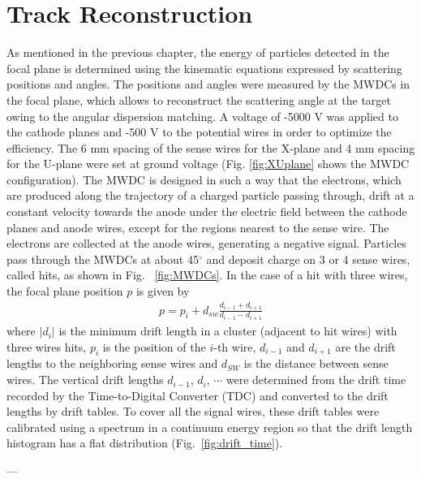 \section{Track Reconstruction}
As mentioned in the previous chapter, the energy of particles detected in the focal plane is determined using the kinematic equations expressed by scattering positions and angles.
The positions and angles were measured by the MWDCs in  the focal plane, which allows to reconstruct the scattering angle at the target owing to the angular dispersion matching. A voltage of -5000 V was applied to the cathode planes and -500 V to the potential wires in order to optimize the efficiency. The 6 mm spacing of the sense wires for the X-plane and 4 mm spacing for the U-plane were set at ground voltage (Fig. \ref{fig:XUplane} shows the MWDC configuration). The MWDC is designed in such a way that  the electrons, which are produced along the trajectory of a charged particle passing through, drift at a constant velocity  towards the anode under the electric field  between the cathode planes and anode wires, except for the regions nearest to the sense wire. The electrons are collected at the anode wires, generating a negative signal. Particles pass through the MWDCs at about 45$^{\circ}$ and deposit charge on 3 or 4 sense wires, called hits, as shown in Fig. ~\ref{fig:MWDCs}. In the case of a hit with three wires, the focal plane position $p$ is given by
\begin{equation}
    \label{eq:position}
    \begin{aligned}
    p=p_i+d_{sw}\frac{d_{i-1}+d_{i+1}}{d_{i-1}-d_{i+1}}
    \end{aligned}
\end{equation}
where $|d_i|$ is the minimum drift length in a cluster (adjacent to hit wires) with three wires hits, $p_i$ is the position of the $i$-th wire, $d_{i-1}$ and $d_{i+1}$ are the drift lengths to the neighboring sense wires and $d_{SW}$ is the distance between sense wires. The vertical drift lengths $d_{i-1}$, $d_{i}$, $\cdots$ were determined from the drift time recorded by the Time-to-Digital Converter (TDC) and converted to the drift lengths by drift tables. To cover all the signal wires, these drift  tables were calibrated using a spectrum in a  continuum energy region so that the drift length histogram has a flat distribution (Fig.~\ref{fig:drift_time}).


---%

